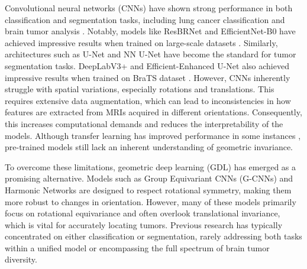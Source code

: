 \documentclass[10pt,twocolumn,letterpaper]{article}
\begin{document}
Convolutional neural networks (CNNs) have shown strong performance in both classification and segmentation tasks, including lung cancer classification \cite{7} and brain tumor analysis \cite{8,9,10}. Notably, models like ResBRNet and EfficientNet-B0 have achieved impressive results when trained on large-scale datasets \cite{11}. Similarly, architectures such as U-Net \cite{12} and NN U-Net \cite{13} have become the standard for tumor segmentation tasks. DeepLabV3+ and Efficient-Enhanced U-Net also achieved impressive results when trained on BraTS dataset \cite{14,15}. However, CNNs inherently struggle with spatial variations, especially rotations and translations. This requires extensive data augmentation, which can lead to inconsistencies in how features are extracted from MRIs acquired in different orientations. Consequently, this increases computational demands and reduces the interpretability of the models. Although transfer learning has improved performance in some instances \cite{16}, pre-trained models still lack an inherent understanding of geometric invariance.

To overcome these limitations, geometric deep learning (GDL) has emerged as a promising alternative. Models such as Group Equivariant CNNs (G-CNNs) \cite{17} and Harmonic Networks \cite{18} are designed to respect rotational symmetry, making them more robust to changes in orientation. However, many of these models primarily focus on rotational equivariance and often overlook translational invariance, which is vital for accurately locating tumors. Previous research has typically concentrated on either classification or segmentation, rarely addressing both tasks within a unified model or encompassing the full spectrum of brain tumor diversity.
\end{document}
